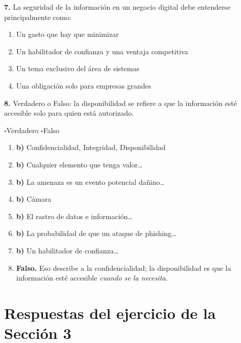 \documentclass[12pt,a4paper]{article}
\newcommand{\checkboxVacio}{$\square$\;}
\begin{document}
\textbf{7.} La seguridad de la informaci\'on en un negocio digital debe entenderse
principalmente como:
\begin{enumerate}[label=\alph*), leftmargin=2.5em]
  \item Un gasto que hay que minimizar
  \item Un habilitador de confianza y una ventaja competitiva
  \item Un tema exclusivo del \'area de sistemas
  \item Una obligaci\'on solo para empresas grandes
\end{enumerate}

\textbf{8.} Verdadero o Falso: la disponibilidad se refiere a que la informaci\'on
est\'e accesible solo para quien est\'a autorizado.

\vspace{4pt}
\checkboxVacio Verdadero \qquad \checkboxVacio Falso

\vspace{12pt}
\begin{tcolorbox}[colback=verdeOK!10, colframe=verdeOK,
                  title={\ding{51}\; Clave de respuestas}, arc=3mm]
\begin{enumerate}[leftmargin=2em]
  \item \textbf{b)} Confidencialidad, Integridad, Disponibilidad
  \item \textbf{b)} Cualquier elemento que tenga valor\ldots
  \item \textbf{b)} La amenaza es un evento potencial da\~nino\ldots
  \item \textbf{b)} C\'amara
  \item \textbf{b)} El rastro de datos e informaci\'on\ldots
  \item \textbf{b)} La probabilidad de que un ataque de phishing\ldots
  \item \textbf{b)} Un habilitador de confianza\ldots
  \item \textbf{Falso.} Eso describe a la confidencialidad; la disponibilidad es
        que la informaci\'on est\'e accesible \emph{cuando se la necesita}.
\end{enumerate}
\end{tcolorbox}

\newpage
\section{Respuestas del ejercicio de la Secci\'on 3}
\end{document}
